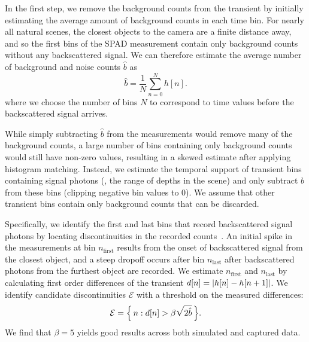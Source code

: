 \vspace{0.8em}
In the first step, we remove the background counts from the
transient by initially estimating the average amount of background counts
in each time bin. For nearly all natural scenes, the closest objects to the
camera are a finite distance away, and so the first bins of the SPAD
measurement contain only background counts without any backscattered
signal. We can therefore estimate the
average number of background and noise counts $\hat{b}$ as 
%
\begin{equation}
  \hat b = \frac{1}{N}\sum_{n=0}^N h[n]. 
  \label{eq:ambient_estimate}
\end{equation}
%
where we choose the number of bins $N$ to correspond to time
values before the backscattered signal arrives. 

While simply subtracting $\hat{b}$ from the measurements would remove many of
the background counts, a large number of bins containing only background counts would still
have non-zero values, resulting in a skewed
estimate after applying histogram matching.  Instead, we estimate the temporal
support of transient bins containing signal photons (\ie, the range of depths in the
scene) and only subtract $\hat{b}$ from these bins (clipping negative bin values
to 0). We assume that other
transient bins contain only background counts that can be discarded. 

Specifically, we identify the first and last bins that record backscattered signal
photons by locating discontinuities in the recorded counts~\cite{Xin2019}. An initial spike in
the measurements at bin $n_\text{first}$ results from the onset of backscattered
signal from the closest object, and a steep dropoff occurs after bin
$n_\text{last}$ after backscattered photons from the
furthest object are recorded. 
We estimate $n_\text{first}$ and $n_\text{last}$ by calculating  
first order differences of the transient $d[n] = \lvert h[n] - h[n+1]\rvert$. 
 We identify candidate discontinuities
$\mathcal{E}$ with a threshold on the measured differences:
%
\begin{equation}
  \mathcal{E} = \mset{n}{d[n] > \beta\sqrt{2\hat b}}.
  \label{eq:edge_set}
\end{equation}
We find that $\beta = 5$ yields good results across both simulated and captured
data.

